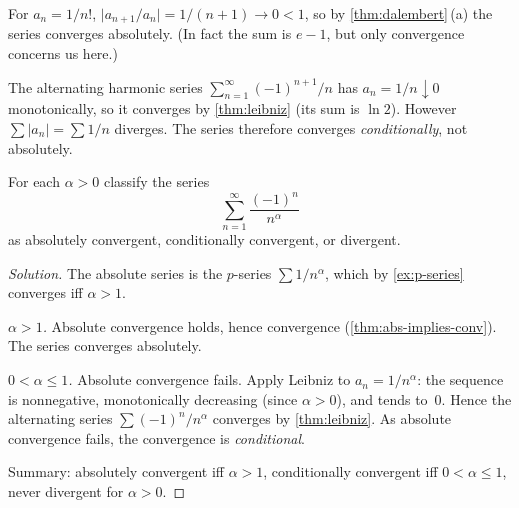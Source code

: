 \begin{example}
\label{ex:factorial-series}
For $a_n = 1/n!$,
$\bigl|a_{n+1}/a_n\bigr| = 1/(n+1) \to 0 < 1$, so by
\cref{thm:dalembert}\,(a) the series converges absolutely. (In
fact the sum is $e - 1$, but only convergence concerns us here.)
\end{example}

\begin{example}
\label{ex:alt-harmonic}
The alternating harmonic series
$\sum_{n=1}^{\infty} (-1)^{n+1}/n$ has $a_n = 1/n \downarrow 0$
monotonically, so it converges by \cref{thm:leibniz} (its sum is
$\ln 2$). However $\sum |a_n| = \sum 1/n$ diverges. The series
therefore converges \emph{conditionally}, not absolutely.
\end{example}

\begin{problem}
\label{prob:series-classify}
For each $\alpha > 0$ classify the series
\[
  \sum_{n=1}^{\infty} \frac{(-1)^n}{n^{\alpha}}
\]
as absolutely convergent, conditionally convergent, or divergent.
\end{problem}

\begin{proof}[Solution]
The absolute series is the $p$-series $\sum 1/n^{\alpha}$, which
by \cref{ex:p-series} converges iff $\alpha > 1$.

\emph{$\alpha > 1$.} Absolute convergence holds, hence convergence
(\cref{thm:abs-implies-conv}). The series converges absolutely.

\emph{$0 < \alpha \le 1$.} Absolute convergence fails. Apply Leibniz
to $a_n = 1/n^{\alpha}$: the sequence is nonnegative, monotonically
decreasing (since $\alpha > 0$), and tends to~$0$. Hence the
alternating series $\sum (-1)^n/n^{\alpha}$ converges by
\cref{thm:leibniz}. As absolute convergence fails, the convergence
is \emph{conditional}.

Summary: absolutely convergent iff $\alpha > 1$, conditionally
convergent iff $0 < \alpha \le 1$, never divergent for $\alpha > 0$.
\end{proof}

